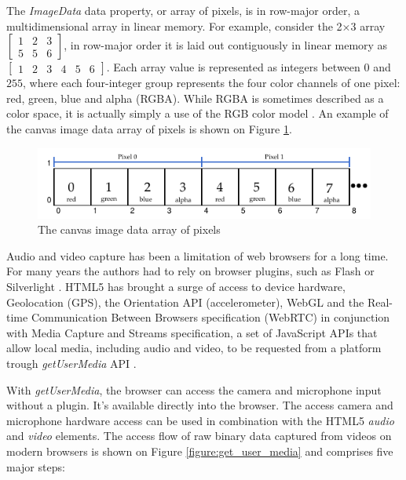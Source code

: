The \textit{ImageData} data property, or array of pixels, is in row-major order, a multidimensional array in linear memory. For example, consider the 2×3 array $\begin{bmatrix}
1 & 2 & 3\\
5 & 5 & 6
\end{bmatrix}$, in row-major order it is laid out contiguously in linear memory as $\begin{bmatrix}
1 & 2 & 3 & 4 & 5 & 6
\end{bmatrix}$. Each array value is represented as integers between $0$ and $255$, where each four-integer group represents the four color channels of one pixel: red, green, blue and alpha (RGBA). While RGBA is sometimes described as a color space, it is actually simply a use of the RGB color model \cite{Gonzalez2007}. An example of the canvas \cite{Canvas2013} image data array of pixels is shown on Figure \ref{figure:imagedata_array}.

\begin{figure}[!htb]
  \centering
  \includegraphics[width=\linewidth]{chapters/basic_concepts/imagedata_array.pdf}
  \caption{The canvas image data array of pixels}
  \label{figure:imagedata_array}
\end{figure}

Audio and video capture has been a limitation of web browsers for a long time. For many years the authors had to rely on browser plugins, such as Flash \cite{Flash2013} or Silverlight \cite{Silverlight2013} \cite{Rocks2013}. HTML5 \cite{Hickson2013} has brought a surge of access to device hardware, Geolocation (GPS), the Orientation API (accelerometer), WebGL \cite{WebGL2013} and the Real-time Communication Between Browsers specification (WebRTC) \cite{WebRTC2013} in conjunction with Media Capture and Streams specification, a set of JavaScript APIs that allow local media, including audio and video, to be requested from a platform trough \textit{getUserMedia} API \cite{WC2006}.

With \textit{getUserMedia}, the browser can access the camera and microphone input without a plugin. It's available directly into the browser. The access camera and microphone hardware access can be used in combination with the HTML5 \cite{Hickson2013} \textit{audio} and \textit{video} elements. The access flow of raw binary data captured from videos on modern browsers is shown on Figure \ref{figure:get_user_media} and comprises five major steps:

